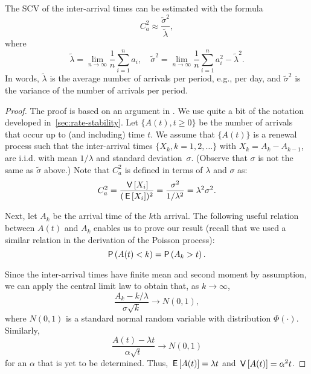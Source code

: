 \begin{theorem} The SCV of the inter-arrival times can be estimated
  with the formula
\begin{equation*}
C_a^2 \approx \frac{\tilde \sigma^2}{\tilde \lambda},
\end{equation*}
where 
\begin{equation*}
\tilde  \lambda = \lim_{n\to\infty} \frac 1n  \sum_{i=1}^n a_i,\quad  
\tilde  \sigma^2 = \lim_{n\to\infty} \frac 1 n \sum_{i=1}^n a_i^2 - \tilde \lambda^2.
\end{equation*}
In words, $\tilde \lambda$ is the average number of arrivals per period, e.g., per day, and $\tilde \sigma^2 $ is the variance of the number of arrivals per period.
\end{theorem}

\begin{proof}
  The proof is based on an argument in \cite{cox62:_renew_theor}.
  We use quite a bit of the notation developed in~\cref{sec:rate-stability}.
  Let $\{A(t), t\geq 0\}$ be the number of arrivals that occur up to (and including) time $t$.
  We assume that $\{A(t)\}$ is a renewal process such that the inter-arrival times $\{X_k, k=1, 2, \ldots\}$ with $X_k = A_{k}-A_{k-1}$, are i.i.d.
  with mean $1/\lambda$ and standard deviation~$\sigma$.
  (Observe that $\sigma$ is not the same as $\tilde \sigma$ above.)
  Note that $C_a^2$ is defined in terms of $\lambda$ and $\sigma$ as:
\begin{equation*}
C_a^2 = \frac{\,\mathsf{V}\left[X_i\right]}{(\,\mathsf{E}\left[X_i\right])^2} = \frac{\sigma^2}{1/\lambda^2} = \lambda^2 \sigma^2.
\end{equation*}

Next, let $A_k$ be the arrival time of the $k$th arrival.
The following useful relation between $A(t)$ and $A_k$ enables us to prove our result (recall that we used a similar relation in the derivation of the Poisson process):
\begin{equation*}
\P{A(t) < k} = \P{A_k > t}.
\end{equation*}

Since the inter-arrival times have finite mean and second moment by assumption, we can apply the central limit law to obtain that, as $k\to\infty$,
\begin{equation*}
\frac{A_k -k/\lambda}{\sigma \sqrt k} \to N(0,1),
\end{equation*}
where $N(0,1)$ is a standard normal random variable with
distribution $\Phi(\cdot)$.  Similarly,
%
\begin{equation*}
\frac{A(t) -\lambda t}{\alpha \sqrt t} \to N(0,1)
\end{equation*}
for an $\alpha$ that is yet to be determined. Thus,
$\,\mathsf{E}\left[A(t)\right] = \lambda t$ and $\,\mathsf{V}\left[A(t)\right]=\alpha^2 t$.


\end{proof}
